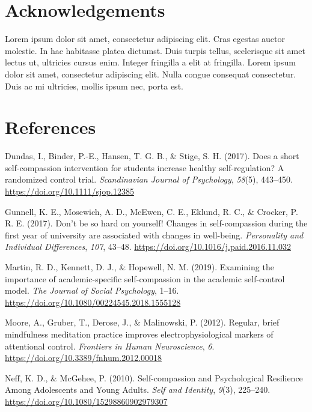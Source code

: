 \documentclass[10pt]{article}
\begin{document}
\section*{Acknowledgements}

{\label{687807}}

Lorem ipsum dolor sit amet, consectetur adipiscing elit. Cras egestas
auctor molestie. In hac habitasse platea dictumst. Duis turpis tellus,
scelerisque sit amet lectus ut, ultricies cursus enim. Integer fringilla
a elit at fringilla. Lorem ipsum dolor sit amet, consectetur adipiscing
elit. Nulla congue consequat consectetur. Duis ac mi ultricies, mollis
ipsum nec, porta est.

\clearpage
\section*{References}\sloppy

\label{csl:3}Dundas, I., Binder, P.-E., Hansen, T. G. B., \& Stige, S. H. (2017). {Does a short self-compassion intervention for students increase healthy self-regulation? {A} randomized control trial}. \textit{Scandinavian Journal of Psychology}, \textit{58}(5), 443–450. \url{https://doi.org/10.1111/sjop.12385}

\label{csl:4}Gunnell, K. E., Mosewich, A. D., McEwen, C. E., Eklund, R. C., \& Crocker, P. R. E. (2017). {Don't be so hard on yourself! {Changes} in self-compassion during the first year of university are associated with changes in well-being}. \textit{Personality and Individual Differences}, \textit{107}, 43–48. \url{https://doi.org/10.1016/j.paid.2016.11.032}

\label{csl:2}Martin, R. D., Kennett, D. J., \& Hopewell, N. M. (2019). {Examining the importance of academic-specific self-compassion in the academic self-control model}. \textit{The Journal of Social Psychology}, 1–16. \url{https://doi.org/10.1080/00224545.2018.1555128}

\label{csl:7}Moore, A., Gruber, T., Derose, J., \& Malinowski, P. (2012). {Regular, brief mindfulness meditation practice improves electrophysiological markers of attentional control}. \textit{Frontiers in Human Neuroscience}, \textit{6}. \url{https://doi.org/10.3389/fnhum.2012.00018}

\label{csl:5}Neff, K. D., \& McGehee, P. (2010). {Self-compassion and Psychological Resilience Among Adolescents and Young Adults}. \textit{Self and Identity}, \textit{9}(3), 225–240. \url{https://doi.org/10.1080/15298860902979307}
\end{document}
